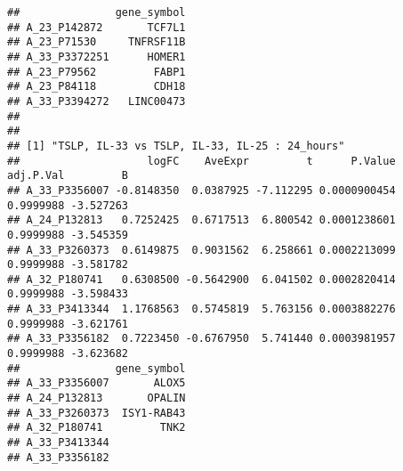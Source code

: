\documentclass[
]{article}
\begin{document}
\begin{verbatim}
##               gene_symbol
## A_23_P142872       TCF7L1
## A_23_P71530     TNFRSF11B
## A_33_P3372251      HOMER1
## A_23_P79562         FABP1
## A_23_P84118         CDH18
## A_33_P3394272   LINC00473
## 
## 
## [1] "TSLP, IL-33 vs TSLP, IL-33, IL-25 : 24_hours"
##                    logFC    AveExpr         t      P.Value adj.P.Val         B
## A_33_P3356007 -0.8148350  0.0387925 -7.112295 0.0000900454 0.9999988 -3.527263
## A_24_P132813   0.7252425  0.6717513  6.800542 0.0001238601 0.9999988 -3.545359
## A_33_P3260373  0.6149875  0.9031562  6.258661 0.0002213099 0.9999988 -3.581782
## A_32_P180741   0.6308500 -0.5642900  6.041502 0.0002820414 0.9999988 -3.598433
## A_33_P3413344  1.1768563  0.5745819  5.763156 0.0003882276 0.9999988 -3.621761
## A_33_P3356182  0.7223450 -0.6767950  5.741440 0.0003981957 0.9999988 -3.623682
##               gene_symbol
## A_33_P3356007       ALOX5
## A_24_P132813       OPALIN
## A_33_P3260373  ISY1-RAB43
## A_32_P180741         TNK2
## A_33_P3413344            
## A_33_P3356182
\end{verbatim}
\end{document}

